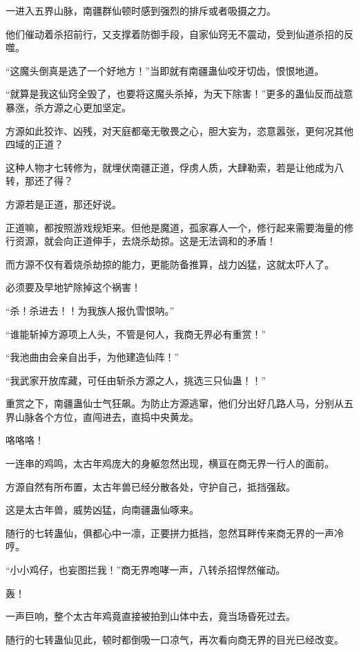 
\begin{this_body}

一进入五界山脉，南疆群仙顿时感到强烈的排斥或者吸摄之力。

他们催动着杀招前行，又支撑着防御手段，自家仙窍无不震动，受到仙道杀招的反噬。

“这魔头倒真是选了一个好地方！”当即就有南疆蛊仙咬牙切齿，恨恨地道。

“就算是我这仙窍全毁了，也要将这魔头杀掉，为天下除害！”更多的蛊仙反而战意暴涨，杀方源之心更加坚定。

方源如此狡诈、凶残，对天庭都毫无敬畏之心，胆大妄为，恣意嚣张，更何况其他四域的正道？

这种人物才七转修为，就埋伏南疆正道，俘虏人质，大肆勒索，若是让他成为八转，那还了得？

方源若是正道，那还好说。

正道嘛，都按照游戏规矩来。但他是魔道，孤家寡人一个，修行起来需要海量的修行资源，就会向正道伸手，去烧杀劫掠。这是无法调和的矛盾！

而方源不仅有着烧杀劫掠的能力，更能防备推算，战力凶猛，这就太吓人了。

必须要及早地铲除掉这个祸害！

“杀！杀进去！！为我族人报仇雪恨呐。”

“谁能斩掉方源项上人头，不管是何人，我商无界必有重赏！”

“我池曲由会亲自出手，为他建造仙阵！”

“我武家开放库藏，可任由斩杀方源之人，挑选三只仙蛊！！”

重赏之下，南疆蛊仙士气狂飙。为防止方源逃窜，他们分出好几路人马，分别从五界山脉各个方位，直闯进去，直捣中央黄龙。

咯咯咯！

一连串的鸡鸣，太古年鸡庞大的身躯忽然出现，横亘在商无界一行人的面前。

方源自然有所布置，太古年兽已经分散各处，守护自己，抵挡强敌。

这是太古年兽，威势凶猛，向南疆蛊仙啄来。

随行的七转蛊仙，俱都心中一凛，正要拼力抵挡，忽然耳畔传来商无界的一声冷哼。

“小小鸡仔，也妄图拦我！”商无界咆哮一声，八转杀招悍然催动。

轰！

一声巨响，整个太古年鸡竟直接被拍到山体中去，竟当场昏死过去。

随行的七转蛊仙见此，顿时都倒吸一口凉气，再次看向商无界的目光已经改变。


\end{this_body}
